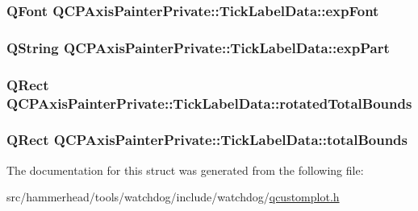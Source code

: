 \subsubsection[{\texorpdfstring{exp\+Font}{expFont}}]{\setlength{\rightskip}{0pt plus 5cm}Q\+Font Q\+C\+P\+Axis\+Painter\+Private\+::\+Tick\+Label\+Data\+::exp\+Font}\hypertarget{structQCPAxisPainterPrivate_1_1TickLabelData_adc10767ebcb719d6927c012a38b9d933}{}\label{structQCPAxisPainterPrivate_1_1TickLabelData_adc10767ebcb719d6927c012a38b9d933}
\subsubsection[{\texorpdfstring{exp\+Part}{expPart}}]{\setlength{\rightskip}{0pt plus 5cm}Q\+String Q\+C\+P\+Axis\+Painter\+Private\+::\+Tick\+Label\+Data\+::exp\+Part}\hypertarget{structQCPAxisPainterPrivate_1_1TickLabelData_a09692e4ea092137278b4ac051d5fdf2b}{}\label{structQCPAxisPainterPrivate_1_1TickLabelData_a09692e4ea092137278b4ac051d5fdf2b}
\subsubsection[{\texorpdfstring{rotated\+Total\+Bounds}{rotatedTotalBounds}}]{\setlength{\rightskip}{0pt plus 5cm}Q\+Rect Q\+C\+P\+Axis\+Painter\+Private\+::\+Tick\+Label\+Data\+::rotated\+Total\+Bounds}\hypertarget{structQCPAxisPainterPrivate_1_1TickLabelData_aa4d38c5ea47c9184a78ee33ae7f1012e}{}\label{structQCPAxisPainterPrivate_1_1TickLabelData_aa4d38c5ea47c9184a78ee33ae7f1012e}
\subsubsection[{\texorpdfstring{total\+Bounds}{totalBounds}}]{\setlength{\rightskip}{0pt plus 5cm}Q\+Rect Q\+C\+P\+Axis\+Painter\+Private\+::\+Tick\+Label\+Data\+::total\+Bounds}\hypertarget{structQCPAxisPainterPrivate_1_1TickLabelData_afbb3163cf4c628914f1b703945419ea5}{}\label{structQCPAxisPainterPrivate_1_1TickLabelData_afbb3163cf4c628914f1b703945419ea5}


The documentation for this struct was generated from the following file\+:\begin{DoxyCompactItemize}
\item 
src/hammerhead/tools/watchdog/include/watchdog/\hyperlink{qcustomplot_8h}{qcustomplot.\+h}\end{DoxyCompactItemize}
